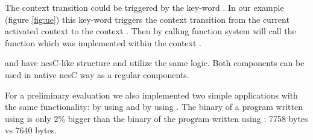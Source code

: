 \documentclass{ubicomp-ext}
\begin{document}
The context transition could be triggered by the key-word {}. In our example (figure \ref{fig:ue}) this key-word triggers the context transition from the current activated context to the context {}. Then by calling function {} system will call the function which was implemented within the context {}.

{} and {} have nesC-like structure and utilize the same logic. Both components can be used in native nesC way as a regular components.

For a preliminary evaluation we also implemented two simple applications with the same functionality: by using {} and by using {}. The binary of a program written using {} is only 2\% bigger than the binary of the program written using {}: 7758 bytes vs 7640 bytes.

\balance


\end{document}

